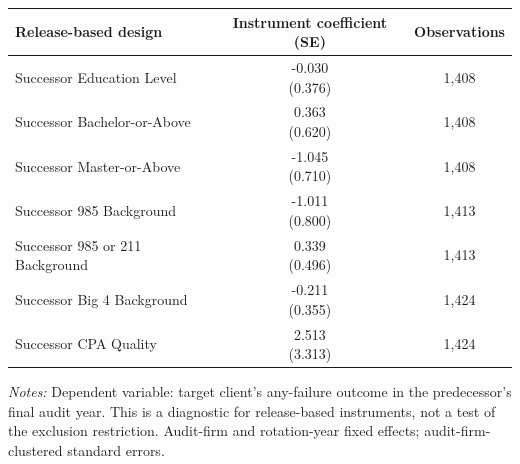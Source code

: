 \documentclass[10pt]{article}
\begin{document}
\begin{minipage}{19cm}\fontsize{10}{12}\selectfont\setlength{\tabcolsep}{4pt}\renewcommand{\arraystretch}{1.12}


\centering
{}
\begin{threeparttable}
\begin{tabular}{p{}cc}
\toprule
Release-based design & Instrument coefficient (SE) & Observations \\
\midrule
Successor Education Level & \shortstack{-0.030\\(0.376)} & 1,408 \\
Successor Bachelor-or-Above & \shortstack{0.363\\(0.620)} & 1,408 \\
Successor Master-or-Above & \shortstack{-1.045\\(0.710)} & 1,408 \\
Successor 985 Background & \shortstack{-1.011\\(0.800)} & 1,413 \\
Successor 985 or 211 Background & \shortstack{0.339\\(0.496)} & 1,413 \\
Successor Big 4 Background & \shortstack{-0.211\\(0.355)} & 1,424 \\
Successor CPA Quality & \shortstack{2.513\\(3.313)} & 1,424 \\
\bottomrule
\end{tabular}
\begin{tablenotes}\fontsize{9}{11}\selectfont
\item \raggedright \fontsize{9}{11}\selectfont \textit{Notes:} Dependent variable: target client's any-failure outcome in the predecessor's final audit year. This is a diagnostic for release-based instruments, not a test of the exclusion restriction. Audit-firm and rotation-year fixed effects; audit-firm-clustered standard errors.
\end{tablenotes}
\end{threeparttable}

\end{minipage}
\end{document}
